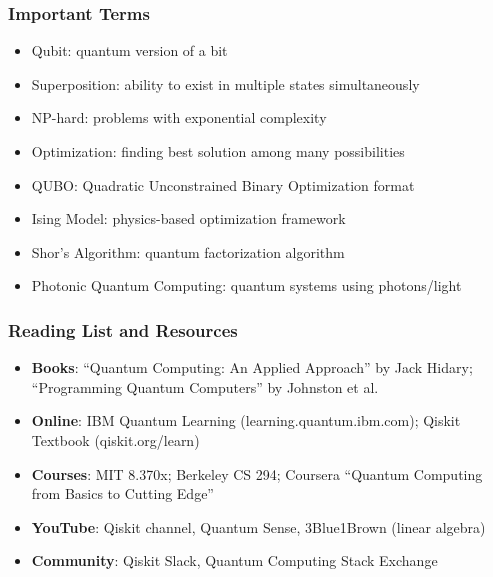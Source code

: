 \begin{frame}[fragile]\frametitle{Important Terms}
\begin{itemize}
\item Qubit: quantum version of a bit
\item Superposition: ability to exist in multiple states simultaneously
\item NP-hard: problems with exponential complexity
\item Optimization: finding best solution among many possibilities
\item QUBO: Quadratic Unconstrained Binary Optimization format
\item Ising Model: physics-based optimization framework
\item Shor's Algorithm: quantum factorization algorithm
\item Photonic Quantum Computing: quantum systems using photons/light
\end{itemize}
\end{frame}

\begin{frame}[fragile]\frametitle{Reading List and Resources}
\begin{itemize}
\item \textbf{Books}: ``Quantum Computing: An Applied Approach'' by Jack Hidary; ``Programming Quantum Computers'' by Johnston et al.
\item \textbf{Online}: IBM Quantum Learning (learning.quantum.ibm.com); Qiskit Textbook (qiskit.org/learn)
\item \textbf{Courses}: MIT 8.370x; Berkeley CS 294; Coursera ``Quantum Computing from Basics to Cutting Edge''
\item \textbf{YouTube}: Qiskit channel, Quantum Sense, 3Blue1Brown (linear algebra)
\item \textbf{Community}: Qiskit Slack, Quantum Computing Stack Exchange
\end{itemize}
\end{frame}
